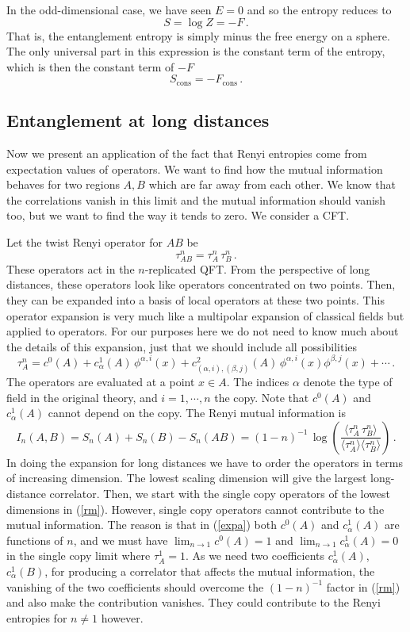 \documentclass[12pt]{article}
\numberwithin{equation}{section}
\newcommand{\be}{\begin{equation}}
\newcommand{\ee}{\end{equation}}
\begin{document}
In the odd-dimensional case, we have seen $E=0$ and so
the entropy reduces to 
\be
S=\log Z=-F\,.
\ee
That is, the entanglement
entropy is simply minus the free energy on a sphere. The only universal part in this expression is the constant term of the entropy, which is then the constant term of $-F$
\be
S_{\textrm{cons}}=-F_{\textrm{cons}}\,.
\ee

\subsection{Entanglement at long distances}
\label{long}
Now we present an application of the fact that Renyi entropies come from expectation values of operators. We want to find how the mutual information behaves for two regions $A,B$ which are far away from each other. We know that the correlations vanish in this limit and the mutual information should vanish too, but we want to find the way it tends to zero. 
We consider a CFT.

Let the twist Renyi operator for $AB$ be
\be
\tau_{AB}^n=\tau_{A}^n \, \tau_B^n\,.
\ee
These operators act in the $n$-replicated QFT. From the perspective of long distances, these operators look like operators concentrated on two points. Then, they can be expanded into a basis of local operators at these two points. This operator expansion is very much like a multipolar expansion of classical fields but applied to operators. For our purposes here we do not need to know much about the details of this expansion, just that we should include all possibilities
\be
 \tau_{A}^n= c^0(A)+c^1_{\alpha}(A)\,\phi^{\alpha,i}(x)+ c^2_{(\alpha,i),(\beta,j)}(A)\, \phi^{\alpha,i}(x)\phi^{\beta,j}(x)+\cdots\,.  \label{expa}
\ee
The operators are evaluated at a point $x\in A$. The indices $\alpha$ denote the type
 of field in the original theory, and $i=1,\cdots,n$ the copy. Note that $c^0(A)$ and $c^1_{\alpha}(A)$ cannot depend on the copy.  
The Renyi mutual information is
\be
I_n(A,B)=S_n(A)+S_n(B)-S_n(AB)=(1-n)^{-1} \,\log\left(\frac{\langle \tau_{A}^n \, \tau_B^n\rangle}{\langle\tau_{A}^n \rangle \langle\tau_{B}^n \rangle}\right)\,.\label{rm}
\ee
In doing the expansion for long distances we have to order the operators in terms of increasing dimension. The lowest scaling dimension will give the largest long-distance correlator. Then, we start with the single copy operators of the lowest dimensions in (\ref{rm}). However, single copy operators cannot contribute to the mutual information. The reason is that in (\ref{expa}) both $c^0(A)$ and $c^1_{\alpha}(A)$ are functions of $n$, and we must have $\lim_{n\rightarrow 1} c^0(A)=1$ and $\lim_{n\rightarrow 1} c^1_{\alpha}(A)=0$ in the single copy limit where $\tau_A^1=1$. As we need two coefficients  $c^1_{\alpha}(A)$, $c^1_{\alpha}(B)$, for producing a correlator that affects the mutual information, the vanishing of the two coefficients should overcome the $(1-n)^{-1}$ factor in (\ref{rm}) and also make the contribution vanishes. They could contribute to the Renyi entropies for $n\neq 1$ however. 
\end{document}
